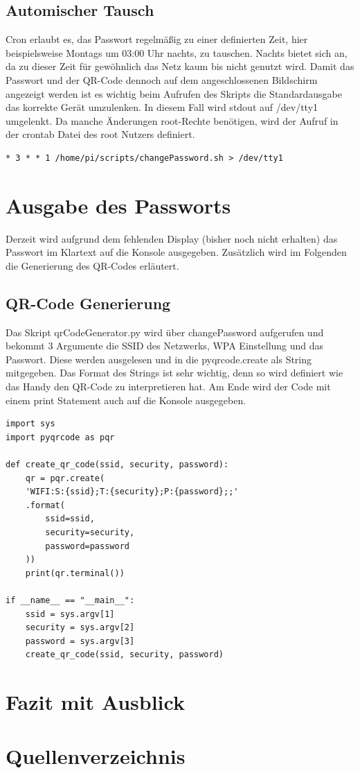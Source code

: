 \documentclass[a4paper,11pt,singlespacing]{article}
\begin{document}
    		\subsection{Automischer Tausch}
    			Cron erlaubt es, das Passwort regelmäßig zu einer definierten Zeit, hier beispielsweise Montags um 03:00 Uhr nachts, zu tauschen. Nachts bietet sich an, da zu dieser Zeit für gewöhnlich das Netz kaum bis nicht genutzt wird. Damit das Passwort und der QR-Code dennoch auf dem angeschlossenen Bildschirm angezeigt werden ist es wichtig beim Aufrufen des Skripts die Standardausgabe das korrekte Gerät umzulenken. In diesem Fall wird stdout auf /dev/tty1 umgelenkt. Da manche Änderungen root-Rechte benötigen, wird der Aufruf in der crontab Datei des root Nutzers definiert.
    			\begin{lstlisting}
* 3 * * 1 /home/pi/scripts/changePassword.sh > /dev/tty1
    			\end{lstlisting}
    		
    		    	
    	\section{Ausgabe des Passworts}
    		Derzeit wird aufgrund dem fehlenden Display (bisher noch nicht erhalten)  das Passwort im Klartext auf die Konsole ausgegeben. Zusätzlich wird im Folgenden die Generierung des QR-Codes erläutert.
    		
    		\subsection{QR-Code Generierung}
			Das Skript qrCodeGenerator.py wird über changePassword aufgerufen und bekommt 3 Argumente die SSID des Netzwerks, WPA Einstellung und das Passwort. Diese werden ausgelesen und in die pyqrcode.create als String mitgegeben. Das Format des Strings ist sehr wichtig, denn so wird definiert wie das Handy den QR-Code zu interpretieren hat. Am Ende wird der Code mit einem print Statement auch auf die Konsole ausgegeben. \\ 
    	
    	\lstset{
    		basicstyle=\ttfamily,
    		language=Python,
    	}
    	

            \begin{lstlisting}
import sys
import pyqrcode as pqr

def create_qr_code(ssid, security, password):
	qr = pqr.create(
	'WIFI:S:{ssid};T:{security};P:{password};;'
	.format(
		ssid=ssid,
		security=security,
		password=password
	))
	print(qr.terminal())

if __name__ == "__main__":
	ssid = sys.argv[1]
	security = sys.argv[2]
	password = sys.argv[3]
	create_qr_code(ssid, security, password)
	 \end{lstlisting}
    	\section{Fazit mit Ausblick}
    	
    	\section{Quellenverzeichnis}
        
        
    	
\end{document}
